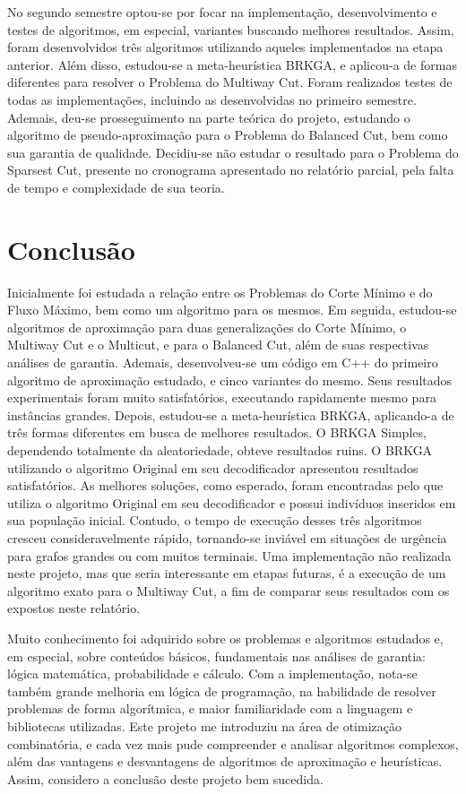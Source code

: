\documentclass[12pt, a4paper]{article}
\begin{document}
No segundo semestre optou-se por focar na implementação, desenvolvimento e testes de algoritmos, em especial, variantes buscando melhores resultados. Assim, foram desenvolvidos três algoritmos utilizando aqueles implementados na etapa anterior. Além disso, estudou-se a meta-heurística BRKGA, e aplicou-a de formas diferentes para resolver o Problema do Multiway Cut. Foram realizados testes de todas as implementações, incluindo as desenvolvidas no primeiro semestre.
Ademais, deu-se prosseguimento na parte teórica do projeto, estudando o algoritmo de pseudo-aproximação para o Problema do Balanced Cut, bem como sua garantia de qualidade.
Decidiu-se não estudar o resultado para o Problema do Sparsest Cut, presente no cronograma apresentado no relatório parcial, pela falta de tempo e complexidade de sua teoria.

\section{Conclusão}\label{sec:conclusao}

Inicialmente foi estudada a relação entre os Problemas do Corte Mínimo e do Fluxo Máximo, bem como um algoritmo para os mesmos.
Em seguida, estudou-se algoritmos de aproximação para duas generalizações do Corte Mínimo, o Multiway Cut e o Multicut, e para o Balanced Cut, além de suas respectivas análises de garantia.
Ademais, desenvolveu-se um código em C++ do primeiro algoritmo de aproximação estudado, e cinco variantes do mesmo.
Seus resultados experimentais foram muito satisfatórios, executando rapidamente mesmo para instâncias grandes. 
Depois, estudou-se a meta-heurística BRKGA, aplicando-a de três formas diferentes em busca de melhores resultados.
O BRKGA Simples, dependendo totalmente da aleatoriedade, obteve resultados ruins. 
O BRKGA utilizando o algoritmo Original em seu decodificador apresentou resultados satisfatórios.
As melhores soluções, como esperado, foram encontradas pelo que utiliza o algoritmo Original em seu decodificador e possui indivíduos inseridos em sua população inicial.
Contudo, o tempo de execução desses três algoritmos cresceu consideravelmente rápido, tornando-se inviável em situações de urgência para grafos grandes ou com muitos terminais. 
Uma implementação não realizada neste projeto, mas que seria interessante em etapas futuras, é a execução de um algoritmo exato para o Multiway Cut, a fim de comparar seus resultados com os expostos neste relatório.

Muito conhecimento foi adquirido sobre os problemas e algoritmos estudados e, em especial, sobre conteúdos básicos, fundamentais nas análises de garantia: lógica matemática, probabilidade e cálculo.
Com a implementação, nota-se também grande melhoria em lógica de programação, na habilidade de resolver problemas de forma algorítmica, e maior familiaridade com a linguagem e bibliotecas utilizadas. 
Este projeto me introduziu na área de otimização combinatória, e cada vez mais pude compreender e analisar algoritmos complexos, além das vantagens e desvantagens de algoritmos de aproximação e heurísticas.
Assim, considero a conclusão deste projeto bem sucedida.\\ 



\end{document}
